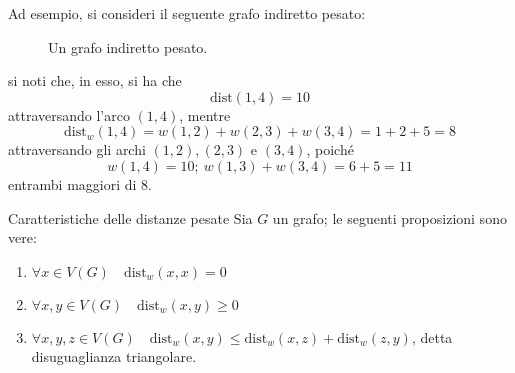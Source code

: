 \documentclass[a4paper, 12pt]{report}
\begin{document}
    \begin{example}
        Ad esempio, si consideri il seguente grafo indiretto pesato:

        \begin{figure}[H]
            \centering
            \caption{Un grafo indiretto pesato.}
        \end{figure}

        si noti che, in esso, si ha che $$\mathrm{dist}(1, 4) = 10$$ attraversando l'arco $(1, 4)$, mentre $$\mathrm{dist}_w(1, 4)=w(1, 2) + w(2, 3) + w(3, 4)=1 + 2 + 5 = 8$$ attraversando gli archi $(1, 2), (2, 3)$ e $(3, 4)$, poiché $$w(1, 4) = 10; \ w(1, 3) + w(3, 4) = 6 + 5 = 11$$ entrambi maggiori di $8$.
    \end{example}

    \begin{framedlem}{Caratteristiche delle distanze pesate}
        \label{caratteristiche distanze pesate}
        Sia $G$ un grafo; le seguenti proposizioni sono vere:

        \begin{enumerate}[label=\roman*), font=\itshape]
            \item $\forall x \in V(G) \quad \mathrm{dist}_w(x, x) = 0$
            \item $\forall x, y \in V(G) \quad \mathrm{dist}_w(x, y) \ge 0$
            \item $\forall x, y, z \in V(G) \quad \mathrm{dist}_w(x, y) \le \mathrm{dist}_w(x, z) + \mathrm{dist}_w(z, y)$, detta \textup{disuguaglianza triangolare}.
        \end{enumerate}
    \end{framedlem}
\end{document}

